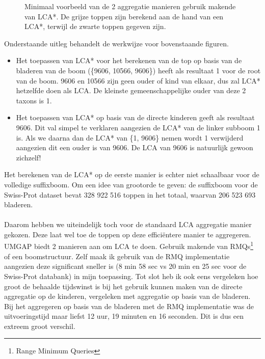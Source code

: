 \begin{figure}[H]
    \centering
    \hspace{0.25\textwidth}%
    \caption{Minimaal voorbeeld van de 2 aggregatie manieren gebruik makende van LCA*. De grijze toppen zijn berekend aan de hand van een LCA*, terwijl de zwarte toppen gegeven zijn.}\label{fig:lca*_diff}
\end{figure}

Onderstaande uitleg behandelt de werkwijze voor bovenstaande figuren.
\begin{itemize}
    \item Het toepassen van LCA* voor het berekenen van de top op basis van de bladeren van de boom (\{9606, 10566, 9606\}) heeft als resultaat 1 voor de root van de boom.
    9606 en 10566 zijn geen ouder of kind van elkaar, dus zal LCA* hetzelfde doen als LCA\@.
    De kleinste gemeenschappelijke ouder van deze 2 taxons is 1.
    \item Het toepassen van LCA* op basis van de directe kinderen geeft als resultaat 9606.
    Dit val simpel te verklaren aangezien de LCA* van de linker subboom 1 is.
    Als we daarna dan de LCA* van \{1, 9606\} nemen wordt 1 verwijderd aangezien dit een ouder is van 9606.
    De LCA van 9606 is natuurlijk gewoon zichzelf!
\end{itemize}

Het berekenen van de LCA* op de eerste manier is echter niet schaalbaar voor de volledige suffixboom.
Om een idee van grootorde te geven: de suffixboom voor de Swiss-Prot dataset bevat 328 922 516 toppen in het totaal, waarvan 206 523 693 bladeren.
\\ \\
Daarom hebben we uiteindelijk toch voor de standaard LCA aggregatie manier gekozen.
Deze laat wel toe de toppen op deze efficiëntere manier te aggregeren.
UMGAP biedt 2 manieren aan om LCA te doen.
Gebruik makende van RMQs\footnote{Range Minimum Queries} of een boomstructuur.
Zelf maak ik gebruik van de RMQ implementatie aangezien deze significant sneller is (8 min 58 sec vs 20 min en 25 sec voor de Swiss-Prot databank) in mijn toepassing.
Tot slot heb ik ook eens vergeleken hoe groot de behaalde tijdswinst is bij het gebruik kunnen maken van de directe aggregatie op de kinderen, vergeleken met aggregatie op basis van de bladeren.
Bij het aggregeren op basis van de bladeren met de RMQ implementatie was de uitvoeringstijd maar liefst 12 uur, 19 minuten en 16 seconden.
Dit is dus een extreem groot verschil.

